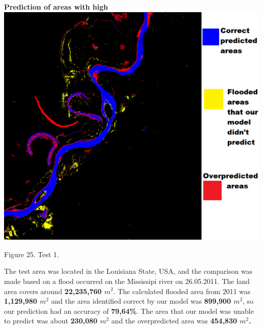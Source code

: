 \documentclass[12pt, a4paper]{report}
\begin{document}
\newpage


\vspace{-60pt}
\chapter{\vspace{-60pt}}
{\Huge \bfseries Prediction of areas with high  }
\\[0.4cm]


\bigskip
\includegraphics[scale=0.6, center]{test_1.png}
\begin{center}
Figure 25. Test 1.
\end{center}
\par 

The test area was located in the Louisiana State, USA, and the comparison was made based on a flood occurred on the Mississipi river on 26.05.2011. The land area covers around \textbf{22,235,760 $m^2$}. The calculated flooded area from 2011 was \textbf{1,129,980 $m^2$} and the area identified correct by our model was \textbf{899,900 $m^2$}, so our prediction had an accuracy of \textbf{79,64\%}. The area that our model was unable to predict was about \textbf{230,080 $m^2$} and the overpredicted area was \textbf{454,830 $m^2$.}
\end{document}
